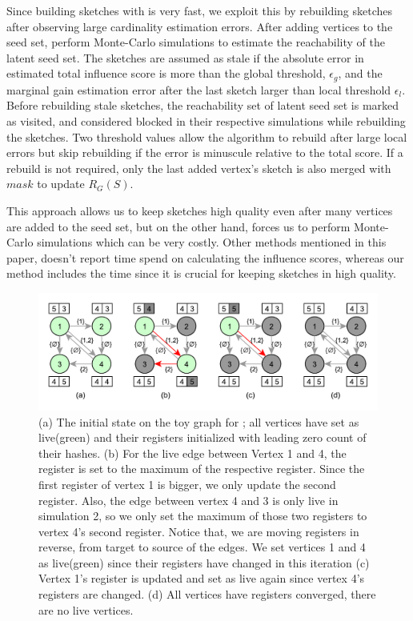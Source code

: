 \documentclass[10pt,journal,compsoc]{IEEEtran}
\newcommand\acro{{\sc{HyperFuseR\xspace}\xspace}\xspace}
\begin{document}
Since building sketches with \acro is very fast, we exploit this by rebuilding sketches after observing large cardinality estimation errors.
After adding vertices to the seed set, \acro perform Monte-Carlo simulations to estimate the reachability of the latent seed set.
The sketches are assumed as stale if the absolute error in estimated total influence score is more than the global threshold, $\epsilon_{g}$, and the marginal gain estimation error after the last sketch larger than local threshold $\epsilon_{l}$. Before rebuilding stale sketches, the reachability set of latent seed set is marked as visited, and considered blocked in their respective simulations while rebuilding the sketches. Two threshold values allow the algorithm to rebuild after large local errors but skip rebuilding if the error is minuscule relative to the total score. If a rebuild is not required, only the last added vertex's sketch is also merged with $mask$ to update $R_G(S)$.

This approach allows us to keep sketches high quality even after many vertices are added to the seed set, but on the other hand, forces us to perform Monte-Carlo simulations which can be very costly. Other methods mentioned in this paper, doesn't report time spend on calculating the influence scores, whereas our method includes the time since it is crucial for keeping sketches in high quality.


\begin{figure}[!ht]
\begin{center}
\includegraphics[width=\linewidth]{images/sketch-diffusion.pdf}
\caption{(a) The initial state on the toy graph for \acro{}; all vertices have set as live(green) and their registers initialized with leading zero count of their hashes. (b) 
For the live edge between Vertex 1 and 4, the register is set to the maximum of the respective register. Since the first register of vertex 1 is bigger, we only update the second register. Also, the edge between vertex 4 and 3 is only live in simulation 2, so we only set the maximum of those two registers to vertex 4's second register. Notice that, we are moving registers in reverse, from target to source of the edges. We set vertices 1 and 4 as live(green) since their registers have changed in this iteration (c) Vertex 1's register is updated and set as live again since vertex 4's registers are changed.  (d) All vertices have registers converged, there are no live vertices. }\label{fig:hf-processing} 
\end{center}
\end{figure}
\end{document}
